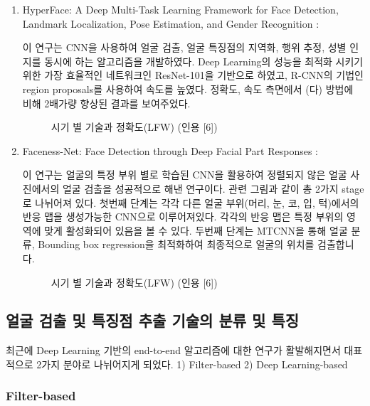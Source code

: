 \begin{enumerate}
    \item HyperFace: A Deep Multi-Task Learning Framework for Face Detection, Landmark Localization, Pose Estimation, and Gender Recognition : 

    이 연구는 CNN을 사용하여 얼굴 검출, 얼굴 특징점의 지역화, 행위 추정, 성별 인지를 동시에 하는 알고리즘을 개발하였다. 
    Deep Learning의 성능을 최적화 시키기 위한 가장 효율적인 네트워크인 ResNet-101을 기반으로 하였고, R-CNN의 기법인 region proposals를 사용하여 속도를 높였다. 
    정확도, 속도 측면에서 (다) 방법에 비해 2배가량 향상된 결과를 보여주었다. 

    \begin{figure}[h!]
        \centering
        \caption{시기 별 기술과 정확도(LFW) (인용 [6])    }
    \end{figure}

    \item Faceness-Net: Face Detection through Deep Facial Part Responses : 

    이 연구는 얼굴의 특정 부위 별로 학습된 CNN을 활용하여 정렬되지 않은 얼굴 사진에서의 얼굴 검출을 성공적으로 해낸 연구이다. 
    관련 그림과 같이 총 2가지 stage로 나뉘어져 있다. 첫번째 단계는 각각 다른 얼굴 부위(머리, 눈, 코, 입, 턱)에서의 반응 맵을 생성가능한 CNN으로 이루어져있다. 
    각각의 반응 맵은 특정 부위의 영역에 맞게 활성화되어 있음을 볼 수 있다. 
    두번째 단계는 MTCNN을 통해 얼굴 분류, Bounding box regression을 최적화하여 최종적으로 얼굴의 위치를 검출합니다. 

    \begin{figure}[h!]
        \centering
        \caption{시기 별 기술과 정확도(LFW) (인용 [6])    }
    \end{figure}

\end{enumerate}

\subsection{ 얼굴 검출 및 특징점 추출 기술의 분류 및 특징 }

최근에 Deep Learning 기반의 end-to-end 알고리즘에 대한 연구가 활발해지면서 대표적으로 2가지 분야로 나뉘어지게 되었다. 1) Filter-based 2) Deep Learning-based

\subsubsection{Filter-based}

